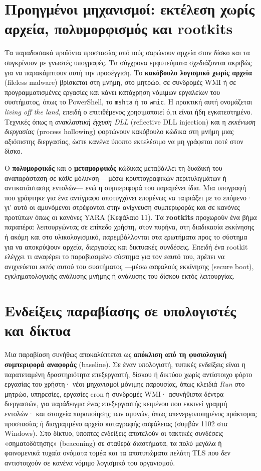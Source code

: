 \section{Προηγμένοι μηχανισμοί: εκτέλεση χωρίς αρχεία, πολυμορφισμός και rootkits}\label{sec:4.2}
Τα παραδοσιακά προϊόντα προστασίας από ιούς σαρώνουν αρχεία στον δίσκο και τα συγκρίνουν με γνωστές υπογραφές. Τα σύγχρονα εμφυτεύματα σχεδιάζονται ακριβώς για να παρακάμπτουν αυτή την προσέγγιση. Το \textbf{κακόβουλο λογισμικό χωρίς αρχεία} (fileless malware) βρίσκεται στη μνήμη, στο μητρώο, σε συνδρομές WMI ή σε προγραμματισμένες εργασίες και κάνει κατάχρηση νόμιμων εργαλείων του συστήματος, όπως το PowerShell, το \texttt{mshta} ή το \texttt{wmic}. Η πρακτική αυτή ονομάζεται \emph{living off the land}, επειδή ο επιτιθέμενος χρησιμοποιεί ό,τι είναι ήδη εγκατεστημένο. Τεχνικές όπως η \emph{ανακλαστική έγχυση DLL} (reflective DLL injection) και η \emph{εκκένωση διεργασίας} (process hollowing) φορτώνουν κακόβουλο κώδικα στη μνήμη μιας αξιόπιστης διεργασίας, ώστε κανένα ύποπτο εκτελέσιμο να μη γράφεται ποτέ στον δίσκο.

Ο \textbf{πολυμορφικός} και ο \textbf{μεταμορφικός} κώδικας μεταβάλλει τη δυαδική του αναπαράσταση σε κάθε μόλυνση —μέσω κρυπτογραφικών περιτυλιγμάτων ή αντικατάστασης εντολών— ενώ η συμπεριφορά του παραμένει ίδια. Μια υπογραφή που γράφτηκε για ένα αντίγραφο αποτυγχάνει επομένως να ταιριάξει με το επόμενο· γι' αυτό οι αμυνόμενοι στρέφονται στην ανίχνευση συμπεριφοράς και σε κανόνες προτύπων όπως οι κανόνες YARA (Κεφάλαιο 11). Τα \textbf{rootkits} προχωρούν ένα βήμα παραπέρα: λειτουργώντας σε επίπεδο χρήστη, στον πυρήνα, στη διαδικασία εκκίνησης ή ακόμη και στο υλικολογισμικό, παρεμβάλλονται στα ερωτήματα προς το σύστημα για να αποκρύψουν αρχεία, διεργασίες και δικτυακές συνδέσεις. Επειδή ένα rootkit ελέγχει τι αναφέρει το παραβιασμένο σύστημα για τον εαυτό του, πρέπει να ανιχνεύεται \emph{εκτός} αυτού του συστήματος —μέσω ασφαλούς εκκίνησης (secure boot), εγκληματολογικής ανάλυσης μνήμης ή ανάλυσης του δίσκου εκτός λειτουργίας.

\section{Ενδείξεις παραβίασης σε υπολογιστές και δίκτυα}\label{sec:4.3}
Μια παραβίαση συνήθως αποκαλύπτεται ως \textbf{απόκλιση από τη φυσιολογική συμπεριφορά αναφοράς} (baseline). Σε έναν υπολογιστή, τυπικές ενδείξεις είναι η παρατεταμένη δραστηριότητα επεξεργαστή, δίσκου ή δικτύου χωρίς αντίστοιχο φόρτο εργασίας του χρήστη· νέοι μηχανισμοί μόνιμης παρουσίας, όπως κλειδιά \emph{Run} στο μητρώο, υπηρεσίες, εργασίες cron ή συνδρομές WMI· ασυνήθιστα δέντρα διεργασιών, για παράδειγμα ένας επεξεργαστής κειμένου που εκκινεί γραμμή εντολών· και στοιχεία παραποίησης των αμυνών, όπως απενεργοποιημένος πράκτορας προστασίας ή διαγραμμένο αρχείο καταγραφής ασφάλειας (συμβάν 1102 στα Windows). Στο δίκτυο, ύποπτες ενδείξεις αποτελούν οι τακτικές συνδέσεις «σηματοδότησης» (beaconing) σε σταθερά διαστήματα, τα πολύ μεγάλα ή φαινομενικά τυχαία ονόματα τομέα και τα αποτυπώματα πελάτη TLS που δεν αντιστοιχούν σε κανένα νόμιμο λογισμικό του οργανισμού.

